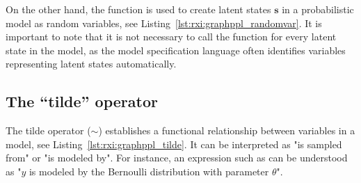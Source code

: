 On the other hand, the  function is used to create latent states $\bm{s}$
in a probabilistic model as random variables, see Listing~\ref{lst:rxi:graphppl_randomvar}.
It is important to note that it is not necessary to call the  function for
every latent state in the model, as the model specification language often identifies
variables representing latent states automatically.
\begin{figure*}[h!]
  \begin{adjustbox}{minipage=\textwidth,margin=0pt \smallskipamount,center}
  \end{adjustbox}
\end{figure*}

\subsection{The ``tilde'' operator}

The tilde operator ($\sim$) establishes a functional relationship between variables in a
model, see Listing~\ref{lst:rxi:graphppl_tilde}.
It can be interpreted as "is sampled from" or "is modeled by".
For instance, an expression such as  can be understood as "$y$ is
modeled by the Bernoulli distribution with parameter $\theta$".
\begin{figure*}[h!]
  \begin{adjustbox}{minipage=\textwidth,margin=0pt \smallskipamount,center}
  \end{adjustbox}
\end{figure*}

